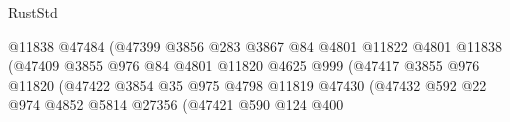 \begin{lexlean}{RustStd}
\begin{coremodule}
                                                    @11838
                                                    @47484
                                                    (@47399
                                                      @3856
                                                      @283
                                                      @3867
                                                      @84
                                                      @4801
                                                      @11822
                                                      @4801
                                                      @11838
                                                      (@47409
                                                        @3855
                                                        @976
                                                        @84
                                                        @4801
                                                        @11820
                                                        @4625
                                                        @999
                                                        (@47417
                                                          @3855
                                                          @976
                                                          @11820
                                                          (@47422
                                                            @3854
                                                            @35
                                                            @975
                                                            @4798
                                                            @11819
                                                            @47430
                                                            (@47432
                                                              @592
                                                              @22
                                                              @974
                                                              @4852
                                                              @5814
                                                              @27356
                                                              (@47421
                                                                @590
                                                                @124
                                                                @400

\end{coremodule}
\end{lexlean}
